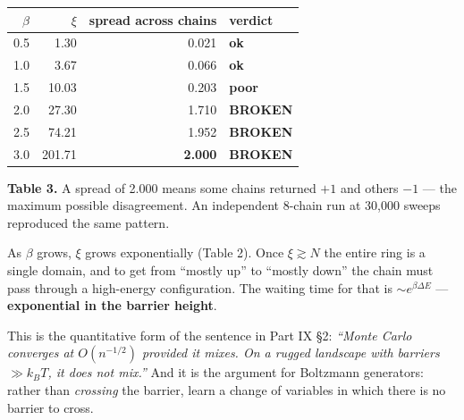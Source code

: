 \begin{center}\small
\begin{tabular}{@{}rrrl@{}}
\toprule
\rowcolor{alert!12}
$\beta$ & $\xi$ & \textbf{spread across chains} & \textbf{verdict}\\
\midrule
0.5 & 1.30 & 0.021 & \textcolor{bio}{\textbf{ok}}\\
1.0 & 3.67 & 0.066 & \textcolor{bio}{\textbf{ok}}\\
1.5 & 10.03 & 0.203 & \textcolor{sand!80!black}{\textbf{poor}}\\
2.0 & 27.30 & 1.710 & \textcolor{alert}{\textbf{BROKEN}}\\
2.5 & 74.21 & 1.952 & \textcolor{alert}{\textbf{BROKEN}}\\
\rowcolor{alert!8}
3.0 & 201.71 & \textbf{2.000} & \textcolor{alert}{\textbf{BROKEN}}\\
\bottomrule
\end{tabular}
\end{center}
\vspace{-2pt}
\begin{center}\begin{minipage}{0.93\textwidth}\footnotesize\color{slate}
\textbf{Table 3.}\; A spread of 2.000 means some chains returned $+1$ and others $-1$ --- the maximum
possible disagreement. An independent 8-chain run at 30{,}000 sweeps reproduced the same pattern.
\end{minipage}\end{center}

\begin{missing}[title={Why --- and it is the same mechanism as the whole of Part IX}]
As $\beta$ grows, $\xi$ grows exponentially (Table 2). Once $\xi\gtrsim N$ the entire ring is a
single domain, and to get from ``mostly up'' to ``mostly down'' the chain must pass through a
high-energy configuration. The waiting time for that is $\sim e^{\beta\Delta E}$ ---
\textbf{exponential in the barrier height}.
\begin{center}
\end{center}
\vspace{-2pt}
This is the quantitative form of the sentence in Part IX §2: \emph{``Monte Carlo converges at
$O(n^{-1/2})$ provided it mixes. On a rugged landscape with barriers $\gg k_BT$, it does not mix.''}
And it is the argument for Boltzmann generators: rather than \emph{crossing} the barrier, learn a
change of variables in which there is no barrier to cross.
\end{missing}

